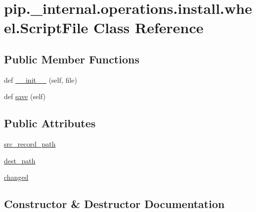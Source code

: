 \hypertarget{classpip_1_1__internal_1_1operations_1_1install_1_1wheel_1_1ScriptFile}{}\section{pip.\+\_\+internal.\+operations.\+install.\+wheel.\+Script\+File Class Reference}
\label{classpip_1_1__internal_1_1operations_1_1install_1_1wheel_1_1ScriptFile}
\subsection*{Public Member Functions}
\begin{DoxyCompactItemize}
\item 
def \hyperlink{classpip_1_1__internal_1_1operations_1_1install_1_1wheel_1_1ScriptFile_af4e5e9d16823d662fc2e40546c9eb0dd}{\+\_\+\+\_\+init\+\_\+\+\_\+} (self, file)
\item 
def \hyperlink{classpip_1_1__internal_1_1operations_1_1install_1_1wheel_1_1ScriptFile_a49776002b45d04fb2de38dfe8ffa17c5}{save} (self)
\end{DoxyCompactItemize}
\subsection*{Public Attributes}
\begin{DoxyCompactItemize}
\item 
\hyperlink{classpip_1_1__internal_1_1operations_1_1install_1_1wheel_1_1ScriptFile_a26a1a3e059c3be2bd7162e7ad74315e0}{src\+\_\+record\+\_\+path}
\item 
\hyperlink{classpip_1_1__internal_1_1operations_1_1install_1_1wheel_1_1ScriptFile_a24b2105618b2b599c12dd48f0a981c00}{dest\+\_\+path}
\item 
\hyperlink{classpip_1_1__internal_1_1operations_1_1install_1_1wheel_1_1ScriptFile_a0b3c84f77968ac88fd7b6a7d2fc40133}{changed}
\end{DoxyCompactItemize}


\subsection{Constructor \& Destructor Documentation}
\mbox{\label{classpip_1_1__internal_1_1operations_1_1install_1_1wheel_1_1ScriptFile_af4e5e9d16823d662fc2e40546c9eb0dd}} 
